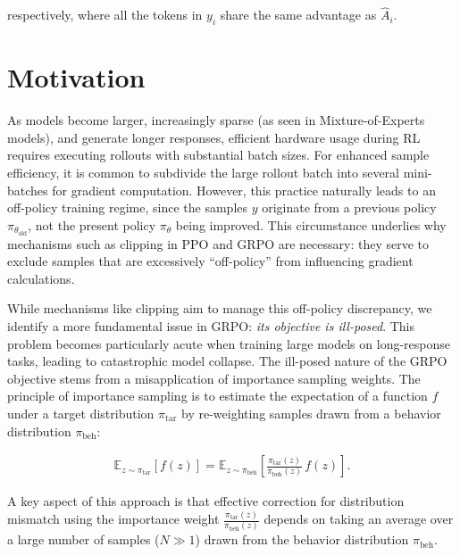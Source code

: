 respectively, where all the tokens in $y_i$ share the same advantage as $\widehat{A}_{i}$.

\section{Motivation}
\label{sec:motivation}

As models become larger, increasingly sparse (as seen in Mixture-of-Experts models), and generate longer responses, efficient hardware usage during RL requires executing rollouts with substantial batch sizes. For enhanced sample efficiency, it is common to subdivide the large rollout batch into several mini-batches for gradient computation. However, this practice naturally leads to an off-policy training regime, since the samples $y$ originate from a previous policy $\pi_{\theta_\text{old}}$, not the present policy $\pi_\theta$ being improved. This circumstance underlies why mechanisms such as clipping in PPO and GRPO are necessary: they serve to exclude samples that are excessively “off-policy” from influencing gradient calculations.

While mechanisms like clipping aim to manage this off-policy discrepancy, we identify a more fundamental issue in GRPO: \textit{its objective is ill-posed}. This problem becomes particularly acute when training large models on long-response tasks, leading to catastrophic model collapse. The ill-posed nature of the GRPO objective stems from a misapplication of importance sampling weights. The principle of importance sampling is to estimate the expectation of a function $f$ under a target distribution $\pi_\text{tar}$ by re-weighting samples drawn from a behavior distribution $\pi_\text{beh}$:

\begin{align}
\mathbb{E}_{z \sim \pi_\text{tar}} \left[ f(z) \right] = \mathbb{E}_{z \sim \pi_\text{beh}} \left[ \frac{ \pi_\text{tar} (z) }{ \pi_\text{beh} (z)} \, f(z) \right].
\end{align}

A key aspect of this approach is that effective correction for distribution mismatch using the importance weight $\frac{ \pi_\text{tar} (z) }{ \pi_\text{beh} (z)}$ depends on taking an average over a large number of samples ($N \gg 1$) drawn from the behavior distribution $\pi_\text{beh}$.

